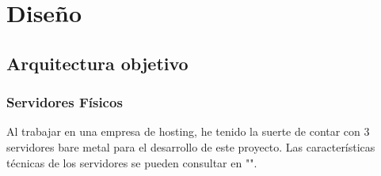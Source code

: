 \chapter {Diseño}
\section{Arquitectura objetivo}
\subsection{Servidores Físicos}
\begin{text}
	Al trabajar en una empresa de hosting, he tenido la suerte de contar con 3 servidores bare metal para el desarrollo de este proyecto. Las características técnicas de los servidores se pueden consultar en "".
\end{text}
